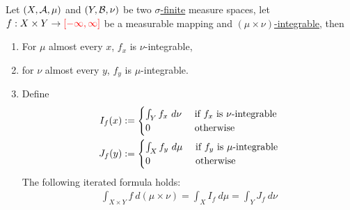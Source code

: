 \documentclass[11pt]{article}
\newcommand{\dmu}[0]{\ d\mu}
\begin{document}
	\begin{theorem}
		Let $(X, \mathcal{{A}}, \mu)$ and $(Y, \mathcal{{B}}, \nu)$ be two \ul{$\sigma$-finite} measure spaces, let $f: X \times Y \to \textcolor{red}{[-\infty, \infty]}$ be a measurable mapping and \ul{$(\mu \times \nu)$-integrable}, then
		\begin{enumerate}
			\item For $\mu$ almost every $x$, $f_x$ is $\nu$-integrable,
			\item for $\nu$ almost every $y$, $f_y$ is $\mu$-integrable.
			\item Define
			\begin{align}
				I_f(x) &:= \begin{cases}
					\int_Y f_x\ d\nu &\text{{ if $f_x$ is $\nu$-integrable}} \\
					0 &\text{{ otherwise}}
				\end{cases} \\
				J_f(y) &:= \begin{cases}
					\int_X f_y\ d\mu &\text{{ if $f_y$ is $\mu$-integrable}} \\
					0 &\text{{ otherwise}}
				\end{cases}
			\end{align}
			The following iterated formula holds:
			\begin{align}
				\int_{X \times Y} f\ d(\mu \times \nu) = \int_X I_f\dmu = \int_Y J_f\ d\nu
			\end{align}
		\end{enumerate}


\end{theorem}
\end{document}
